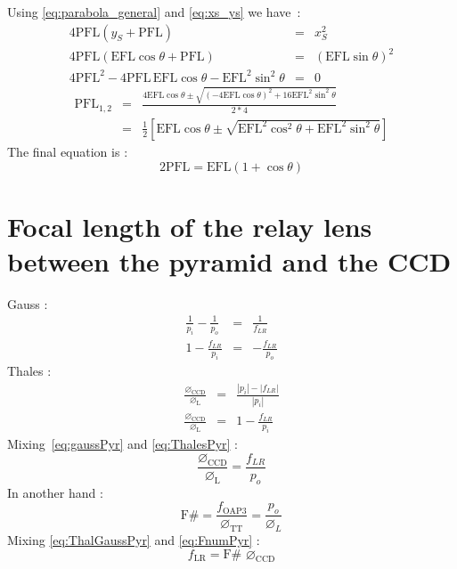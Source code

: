 Using \eqref{eq:parabola_general} and \eqref{eq:xs_ys} we have~:
\begin{eqnarray}
	4\text{PFL}\left(y_S+\text{PFL}\right) &= &x_S^2 \nonumber \\
	4\text{PFL}\left(\text{EFL}\cos\theta+\text{PFL}\right) &= &\left(\text{EFL}\sin\theta\right)^2\nonumber\\ 
	4\text{PFL}^2 - 4\text{PFL}\,\text{EFL}\cos\theta-\text{EFL}^2\sin^2\theta &= &0 \nonumber
\end{eqnarray}
\begin{eqnarray}
	\text{PFL}_{1,2} &= &\frac{4\text{EFL}\cos\theta\pm\sqrt{\left(-4\text{EFL}\cos\theta\right)^2+16\text{EFL}^2\sin^2\theta}}{2*4}  \nonumber\\
	&= &\frac{1}{2}\left[\text{EFL}\cos\theta\pm\sqrt{\text{EFL}^2\cos^2\theta+\text{EFL}^2\sin^2\theta}\right] \nonumber
\end{eqnarray}
The final equation is :
\begin{equation}
	2\text{PFL} = \text{EFL}\left(1+\cos\theta\right)\label{eq:EFL2PFL}
\end{equation}






\newpage
\section{Focal length of the relay lens between the pyramid and the CCD}\label{sec:PYR2CCD}
Gauss :
\begin{eqnarray}
	\frac{1}{p_i}-\frac{1}{p_o} &= &\frac{1}{f_{LR}}	\nonumber\\
	1-\frac{f_{LR}}{p_i} &= &-\frac{f_{LR}}{p_o}\label{eq:gaussPyr}
\end{eqnarray}
Thales :
\begin{eqnarray}
	\frac{\diameter_\text{CCD}}{\diameter_\text{L}} &= &\frac{|p_i|-|f_{LR}|}{|p_i|}\nonumber\\
	\frac{\diameter_\text{CCD}}{\diameter_\text{L}} &= &1-\frac{f_{LR}}{p_i}\label{eq:ThalesPyr}
\end{eqnarray}
Mixing~\eqref{eq:gaussPyr} and \eqref{eq:ThalesPyr} :
\begin{equation}
	\frac{\diameter_\text{CCD}}{\diameter_\text{L}} = \frac{f_{LR}}{p_o}\label{eq:ThalGaussPyr}
\end{equation}
In another hand :
\begin{equation}
	\text{F}\# = \frac{f_\text{OAP3}}{\diameter_\text{TT}} = \frac{p_o}{\diameter_L}\label{eq:FnumPyr}
\end{equation}
Mixing \eqref{eq:ThalGaussPyr} and \eqref{eq:FnumPyr} :
\begin{equation}
f_\text{LR} = \text{F}\#\,\,\diameter_\text{CCD}
\end{equation}



